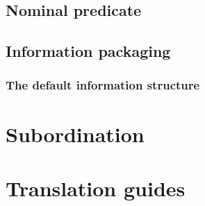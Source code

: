 \documentclass[UTF8, a4paper, oneside, scheme=plain]{ctexart}
\newcommand*{\citesec}[1]{\S~{#1}}
\begin{document}
\subsection{Nominal predicate}\label{sec:nominal-predicate}

\citet[\citesec{7.6}]{zhudexigrammar}


\subsection{Information packaging}\label{sec:information-packaging}

\subsubsection{The default information structure}


\section{Subordination}

\section{Translation guides}



\end{document}
